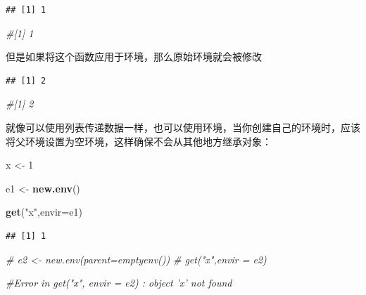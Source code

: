 \documentclass[]{book}
\newenvironment{Shaded}{\begin{snugshade}}{\end{snugshade}}
\newcommand{\KeywordTok}[1]{\textcolor[rgb]{0.13,0.29,0.53}{\textbf{#1}}}
\newcommand{\DataTypeTok}[1]{\textcolor[rgb]{0.13,0.29,0.53}{#1}}
\newcommand{\DecValTok}[1]{\textcolor[rgb]{0.00,0.00,0.81}{#1}}
\newcommand{\StringTok}[1]{\textcolor[rgb]{0.31,0.60,0.02}{#1}}
\newcommand{\CommentTok}[1]{\textcolor[rgb]{0.56,0.35,0.01}{\textit{#1}}}
\newcommand{\OperatorTok}[1]{\textcolor[rgb]{0.81,0.36,0.00}{\textbf{#1}}}
\newcommand{\NormalTok}[1]{#1}
\begin{document}
\begin{verbatim}
## [1] 1
\end{verbatim}

\begin{Shaded}
\begin{Highlighting}[]
\CommentTok{#[1] 1}
\end{Highlighting}
\end{Shaded}

但是如果将这个函数应用于环境，那么原始环境就会被修改

\begin{Shaded}
\end{Shaded}

\begin{verbatim}
## [1] 2
\end{verbatim}

\begin{Shaded}
\begin{Highlighting}[]
\CommentTok{#[1] 2}
\end{Highlighting}
\end{Shaded}

就像可以使用列表传递数据一样，也可以使用环境，当你创建自己的环境时，应该将父环境设置为空环境，这样确保不会从其他地方继承对象：

\begin{Shaded}
\begin{Highlighting}[]
\NormalTok{x <-}\StringTok{ }\DecValTok{1}

\NormalTok{e1 <-}\StringTok{ }\KeywordTok{new.env}\NormalTok{()}

\KeywordTok{get}\NormalTok{(}\StringTok{"x"}\NormalTok{,}\DataTypeTok{envir=}\NormalTok{e1)}
\end{Highlighting}
\end{Shaded}

\begin{verbatim}
## [1] 1
\end{verbatim}

\begin{Shaded}
\begin{Highlighting}[]
\CommentTok{# e2 <- new.env(parent=emptyenv())}
\CommentTok{# get("x",envir = e2)}

\CommentTok{#Error in get("x", envir = e2) : object 'x' not found}
\end{Highlighting}
\end{Shaded}
\end{document}
